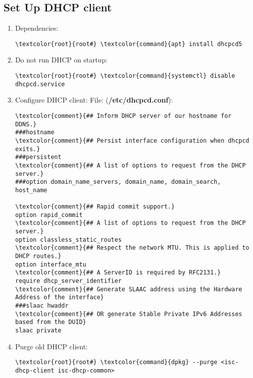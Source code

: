 \documentclass[10pt, a4paper, onecolumn, openany]{book} %
\begin{document}
\subsection{Set Up DHCP client}
\begin{enumerate}
    \item Dependencies:
\begin{Verbatim}[commandchars=\\\{\}]
\textcolor{root}{root#} \textcolor{command}{apt} install dhcpcd5
\end{Verbatim}
    \item Do not run DHCP on startup:
\begin{Verbatim}[commandchars=\\\{\}]
\textcolor{root}{root#} \textcolor{command}{systemctl} disable dhcpcd.service
\end{Verbatim}
    \item Configure DHCP client:
\newline File: (\textbf{\textcolor{file}{/etc/dhcpcd.conf}}):
\begin{Verbatim}[commandchars=\\\{\}]
\textcolor{comment}{## Inform DHCP server of our hostname for DDNS.}
###hostname
\textcolor{comment}{## Persist interface configuration when dhcpcd exits.}
###persistent
\textcolor{comment}{## A list of options to request from the DHCP server.}
###option domain_name_servers, domain_name, domain_search, host_name

\textcolor{comment}{## Rapid commit support.}
option rapid_commit
\textcolor{comment}{## A list of options to request from the DHCP server.}
option classless_static_routes
\textcolor{comment}{## Respect the network MTU. This is applied to DHCP routes.}
option interface_mtu
\textcolor{comment}{## A ServerID is required by RFC2131.}
require dhcp_server_identifier
\textcolor{comment}{## Generate SLAAC address using the Hardware Address of the interface}
###slaac hwaddr
\textcolor{comment}{## OR generate Stable Private IPv6 Addresses based from the DUID}
slaac private
\end{Verbatim}
    \item Purge old DHCP client:
\begin{Verbatim}[commandchars=\\\{\}]
\textcolor{root}{root#} \textcolor{command}{dpkg} --purge <isc-dhcp-client isc-dhcp-common>
\end{Verbatim}
\end{enumerate}
\end{document}
